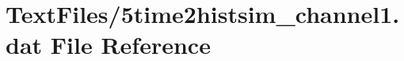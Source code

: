 \hypertarget{5time2histsim__channel1_8dat}{}\section{Text\+Files/5time2histsim\+\_\+channel1.dat File Reference}
\label{5time2histsim__channel1_8dat}
